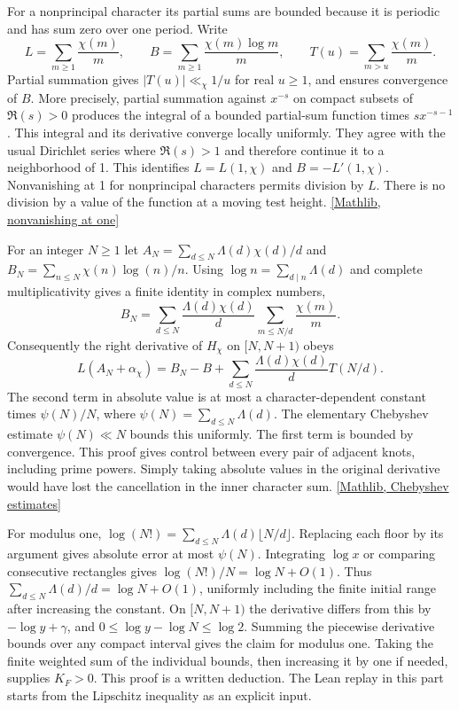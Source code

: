 \documentclass[12pt,letterpaper]{article}
\begin{document}
For a nonprincipal character its partial sums are bounded because it is periodic and has sum zero over one period. Write
\[
 L=\sum_{m\ge1}\frac{\chi(m)}m,\qquad B=\sum_{m\ge1}\frac{\chi(m)\log m}{m},
 \qquad T(u)=\sum_{m>u}\frac{\chi(m)}m .
\]
Partial summation gives \(|T(u)|\ll_\chi 1/u\) for real \(u\ge1\), and ensures convergence of \(B\). More precisely, partial summation against \(x^{-s}\) on compact subsets of \(\Re(s)>0\) produces the integral of a bounded partial-sum function times \(s x^{-s-1}\). This integral and its derivative converge locally uniformly. They agree with the usual Dirichlet series where \(\Re(s)>1\) and therefore continue it to a neighborhood of 1. This identifies \(L=L(1,\chi)\) and \(B=-L'(1,\chi)\). Nonvanishing at 1 for nonprincipal characters permits division by \(L\). There is no division by a value of the function at a moving test height. \href{https://github.com/leanprover-community/mathlib4/blob/0df444a360eaa60ab8c11dca51a86af692955474/Mathlib/NumberTheory/LSeries/Nonvanishing.lean}{[Mathlib, nonvanishing at one]}

For an integer \(N\ge1\) let \(A_N=\sum_{d\le N}\Lambda(d)\chi(d)/d\) and \(B_N=\sum_{n\le N}\chi(n)\log(n)/n\). Using \(\log n=\sum_{d\mid n}\Lambda(d)\) and complete multiplicativity gives a finite identity in complex numbers,
\[
 B_N=\sum_{d\le N}\frac{\Lambda(d)\chi(d)}d\sum_{m\le N/d}\frac{\chi(m)}m .
\]
Consequently the right derivative of \(H_\chi\) on \([N,N+1)\) obeys
\begin{equation}\label{eq:slope}
 L(A_N+\alpha_\chi)= B_N-B+
       \sum_{d\le N}\frac{\Lambda(d)\chi(d)}d T(N/d).
\end{equation}
The second term in absolute value is at most a character-dependent constant times \(\psi(N)/N\), where \(\psi(N)=\sum_{d\le N}\Lambda(d)\). The elementary Chebyshev estimate \(\psi(N)\ll N\) bounds this uniformly. The first term is bounded by convergence. This proof gives control between every pair of adjacent knots, including prime powers. Simply taking absolute values in the original derivative would have lost the cancellation in the inner character sum. \href{https://github.com/leanprover-community/mathlib4/blob/0df444a360eaa60ab8c11dca51a86af692955474/Mathlib/NumberTheory/Chebyshev.lean}{[Mathlib, Chebyshev estimates]}

For modulus one,
\(\log(N!)=\sum_{d\le N}\Lambda(d)\lfloor N/d\rfloor\).
Replacing each floor by its argument gives absolute error at most \(\psi(N)\). Integrating \(\log x\) or comparing consecutive rectangles gives \(\log(N!)/N=\log N+O(1)\). Thus \(\sum_{d\le N}\Lambda(d)/d=\log N+O(1)\), uniformly including the finite initial range after increasing the constant. On \([N,N+1)\) the derivative differs from this by \(-\log y+\gamma\), and \(0\le\log y-\log N\le\log 2\). Summing the piecewise derivative bounds over any compact interval gives the claim for modulus one. Taking the finite weighted sum of the individual bounds, then increasing it by one if needed, supplies \(K_F>0\). This proof is a written deduction. The Lean replay in this part starts from the Lipschitz inequality as an explicit input.
\end{document}
